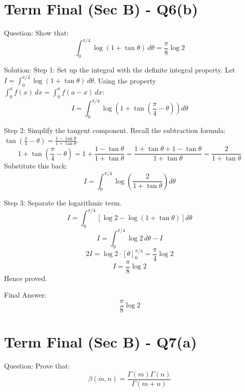 \documentclass{article}
\begin{document}
\section*{Term Final (Sec B) - Q6(b)}
Question:
Show that:
\[
\int_0^{\pi/4} \log(1 + \tan\theta) \, d\theta = \frac{\pi}{8} \log 2
\]

Solution:
Step 1: Set up the integral with the definite integral property.
Let $I = \int_0^{\pi/4} \log(1 + \tan\theta) \, d\theta$.
Using the property $\int_0^a f(x) \, dx = \int_0^a f(a-x) \, dx$:
\[
I = \int_0^{\pi/4} \log\left( 1 + \tan\left( \frac{\pi}{4} - \theta \right) \right) d\theta
\]

Step 2: Simplify the tangent component.
Recall the subtraction formula: $\tan\left(\frac{\pi}{4} - \theta\right) = \frac{1-\tan\theta}{1+\tan\theta}$.
\[
1 + \tan\left(\frac{\pi}{4} - \theta\right) = 1 + \frac{1-\tan\theta}{1+\tan\theta} = \frac{1+\tan\theta + 1-\tan\theta}{1+\tan\theta} = \frac{2}{1+\tan\theta}
\]
Substitute this back:
\[
I = \int_0^{\pi/4} \log\left( \frac{2}{1+\tan\theta} \right) d\theta
\]

Step 3: Separate the logarithmic term.
\[
I = \int_0^{\pi/4} \left[ \log 2 - \log(1+\tan\theta) \right] d\theta
\]
\[
I = \int_0^{\pi/4} \log 2 \, d\theta - I
\]
\[
2I = \log 2 \cdot [\theta]_0^{\pi/4} = \frac{\pi}{4} \log 2
\]
\[
I = \frac{\pi}{8} \log 2
\]
Hence proved.

Final Answer:
\[
\boxed{\frac{\pi}{8} \log 2}
\]

\section*{Term Final (Sec B) - Q7(a)}
Question:
Prove that:
\[
\beta(m, n) = \frac{\Gamma(m)\Gamma(n)}{\Gamma(m+n)}
\]
\end{document}
